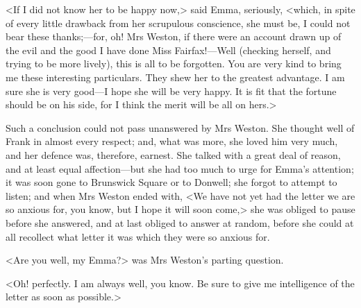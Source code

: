 <If I did not know her to be happy now,> said Emma, seriously, <which, in spite of every little drawback from her scrupulous conscience, she must be, I could not bear these thanks;—for, oh! Mrs Weston, if there were an account drawn up of the evil and the good I have done Miss Fairfax!—Well (checking herself, and trying to be more lively), this is all to be forgotten. You are very kind to bring me these interesting particulars. They shew her to the greatest advantage. I am sure she is very good—I hope she will be very happy. It is fit that the fortune should be on his side, for I think the merit will be all on hers.>

Such a conclusion could not pass unanswered by Mrs Weston. She thought well of Frank in almost every respect; and, what was more, she loved him very much, and her defence was, therefore, earnest. She talked with a great deal of reason, and at least equal affection—but she had too much to urge for Emma's attention; it was soon gone to Brunswick Square or to Donwell; she forgot to attempt to listen; and when Mrs Weston ended with, <We have not yet had the letter we are so anxious for, you know, but I hope it will soon come,> she was obliged to pause before she answered, and at last obliged to answer at random, before she could at all recollect what letter it was which they were so anxious for.

<Are you well, my Emma?> was Mrs Weston's parting question.

<Oh! perfectly. I am always well, you know. Be sure to give me intelligence of the letter as soon as possible.>

